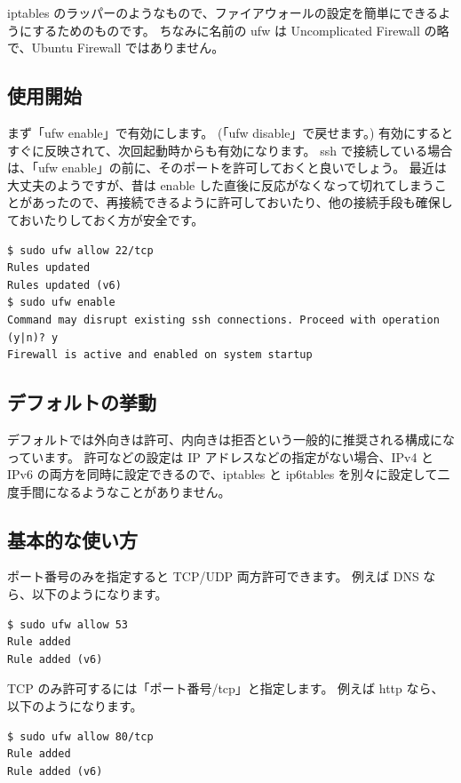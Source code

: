 \documentclass[mingoth,a4paper]{jsarticle}
\begin{document}
iptables のラッパーのようなもので、ファイアウォールの設定を簡単にできるようにするためのものです。
ちなみに名前の ufw は Uncomplicated Firewall の略で、Ubuntu Firewall ではありません。

\subsection{使用開始}

まず「ufw enable」で有効にします。 (「ufw disable」で戻せます。)
有効にするとすぐに反映されて、次回起動時からも有効になります。
ssh で接続している場合は、「ufw enable」の前に、そのポートを許可しておくと良いでしょう。
最近は大丈夫のようですが、昔は enable した直後に反応がなくなって切れてしまうことがあったので、再接続できるように許可しておいたり、他の接続手段も確保しておいたりしておく方が安全です。

\begin{verbatim}
$ sudo ufw allow 22/tcp
Rules updated
Rules updated (v6)
$ sudo ufw enable
Command may disrupt existing ssh connections. Proceed with operation (y|n)? y
Firewall is active and enabled on system startup
\end{verbatim}

\subsection{デフォルトの挙動}

デフォルトでは外向きは許可、内向きは拒否という一般的に推奨される構成になっています。
許可などの設定は IP アドレスなどの指定がない場合、IPv4 と IPv6 の両方を同時に設定できるので、iptables と ip6tables を別々に設定して二度手間になるようなことがありません。

\subsection{基本的な使い方}

ポート番号のみを指定すると TCP/UDP 両方許可できます。
例えば DNS なら、以下のようになります。

\begin{verbatim}
$ sudo ufw allow 53
Rule added
Rule added (v6)
\end{verbatim}

TCP のみ許可するには「ポート番号/tcp」と指定します。
例えば http なら、以下のようになります。

\begin{verbatim}
$ sudo ufw allow 80/tcp
Rule added
Rule added (v6)
\end{verbatim}
\end{document}
